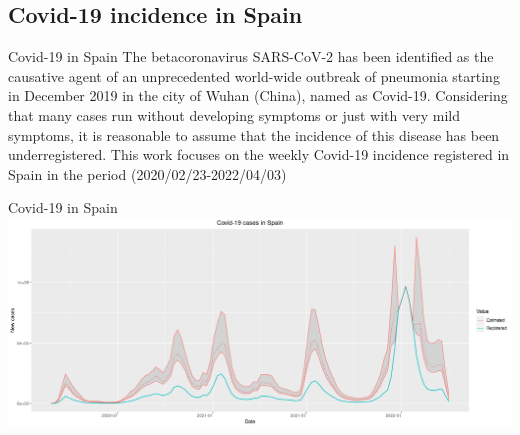 \documentclass[aspectratio=169,usepdftitle=true]{beamer}
\begin{document}

\subsection{Covid-19 incidence in Spain}
\begin{frame}{Covid-19 in Spain}
The betacoronavirus SARS-CoV-2 has been identified as the causative agent of an unprecedented world-wide outbreak of pneumonia starting in December 2019 in the city of Wuhan (China), named as Covid-19. Considering that many cases run without developing symptoms or just with very mild symptoms, it is reasonable to assume that the incidence of this disease has been underregistered. This work focuses on the weekly Covid-19 incidence registered in Spain in the period (2020/02/23-2022/04/03) 
\end{frame}

\begin{frame}[fragile]{Covid-19 in Spain}
\centering
\includegraphics[scale=0.3]{global_Spain.png}
\end{frame}
\end{document}
